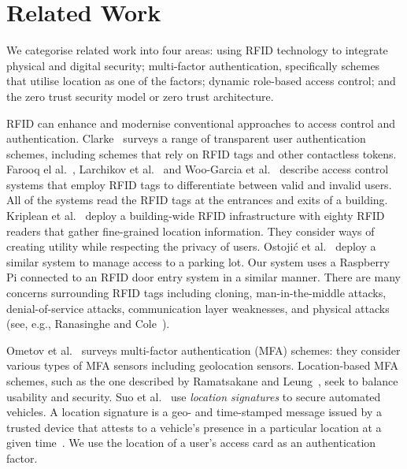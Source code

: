 \section{Related Work}\label{sec:related-work}

We categorise related work into four areas: using RFID technology to
integrate physical and digital security; multi-factor authentication,
specifically schemes that utilise location as one of the factors;
dynamic role-based access control; and the zero trust security model
or zero trust architecture.

RFID can enhance and modernise conventional approaches to access
control and authentication.  Clarke~\cite{clarke-11} surveys a range
of transparent user authentication schemes, including schemes that
rely on RFID tags and other contactless tokens.  Farooq el
al.~\cite{farooq-et-al-14}, Larchikov et al.~\cite{larchikov-et-al-14}
and Woo-Garcia et al.~\cite{woo-garcia-et-al-16} describe access
control systems that employ RFID tags to differentiate between valid
and invalid users.  All of the systems read the RFID tags at the
entrances and exits of a building.  Kriplean et
al.~\cite{kriplean-et-al-07} deploy a building-wide RFID
infrastructure with eighty RFID readers that gather fine-grained
location information.  They consider ways of creating utility while
respecting the privacy of users.  Ostoji\'c et
al.~\cite{ostojic-et-al-07} deploy a similar system to manage access
to a parking lot.  Our system uses a Raspberry Pi connected to an RFID
door entry system in a similar manner.  There are many concerns
surrounding RFID tags including cloning, man-in-the-middle attacks,
denial-of-service attacks, communication layer weaknesses, and
physical attacks (see, e.g., Ranasinghe and
Cole~\cite{ranasinghe-cole-06}).

Ometov et al.~\cite{ometov-et-al-18} surveys multi-factor
authentication (MFA) schemes: they consider various types of MFA
sensors including geolocation sensors.  Location-based MFA schemes,
such as the one described by Ramatsakane and
Leung~\cite{ramatsakane-leung-17}, seek to balance usability and
security.  Suo et al.~\cite{suo-et-al-22} use \textit{location
  signatures} to secure automated vehicles.  A location signature is a
geo- and time-stamped message issued by a trusted device that attests
to a vehicle's presence in a particular location at a given
time~\cite{chen-et-al-09}.  We use the location of a user's access
card as an authentication factor.

